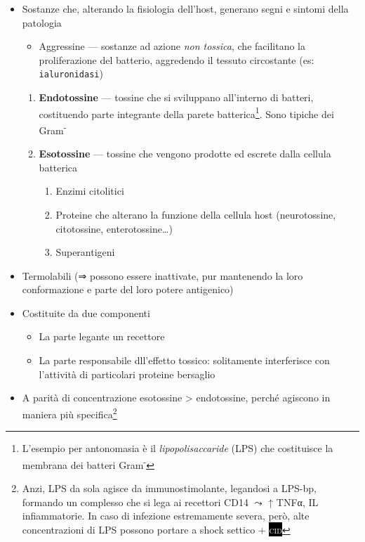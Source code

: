 \documentclass[italian,]{article}
\providecommand{\tightlist}{%
  \setlength{\itemsep}{0pt}\setlength{\parskip}{0pt}}
\newcommand{\pat}[1]{\colorbox{black}{\textcolor{white}{\textsc{#1}}}}
\begin{document}
\begin{itemize}
\tightlist
\item
  Sostanze che, alterando la fisiologia dell'host, generano segni e
  sintomi della patologia

  \begin{itemize}
  \tightlist
  \item
    Aggressine --- sostanze ad azione \emph{non tossica}, che facilitano
    la proliferazione del batterio, aggredendo il tessuto circostante
    (es: \texttt{ialuronidasi})
  \end{itemize}

  \begin{enumerate}
  \def\labelenumi{\arabic{enumi}.}
  \tightlist
  \item
    \textbf{Endotossine} --- tossine che si sviluppano all'interno di
    batteri, costituendo parte integrante della parete
    batterica\footnote{L'esempio per antonomasia è il
      \emph{lipopolisaccaride} (LPS) che costituisce la membrana dei
      batteri Gram\textsuperscript{-}}. Sono tipiche dei
    Gram\textsuperscript{-}
  \item
    \textbf{Esotossine} --- tossine che vengono prodotte ed escrete
    dalla cellula batterica

    \begin{enumerate}
    \def\labelenumii{\arabic{enumii}.}
    \tightlist
    \item
      Enzimi citolitici
    \item
      Proteine che alterano la funzione della cellula host
      (neurotossine, citotossine, enterotossine\ldots{})
    \item
      Superantigeni
    \end{enumerate}
  \end{enumerate}
\item
  Termolabili (⇒ possono essere inattivate, pur mantenendo la loro
  conformazione e parte del loro potere antigenico)
\item
  Costituite da due componenti

  \begin{itemize}
  \tightlist
  \item
    La parte legante un recettore
  \item
    La parte responsabile dll'effetto tossico: solitamente interferisce
    con l'attività di particolari proteine bersaglio
  \end{itemize}
\item
  A parità di concentrazione esotossine \textgreater{} endotossine,
  perché agiscono in maniera più specifica\footnote{Anzi, LPS da sola
    agisce da immunostimolante, legandosi a LPS-bp, formando un
    complesso che si lega ai recettori CD14 \(\leadsto\) ↑ TNFα, IL
    infiammatorie. In caso di infezione estremamente severa, però, alte
    concentrazioni di LPS possono portare a shock settico + \pat{cid}}
\end{itemize}
\end{document}
